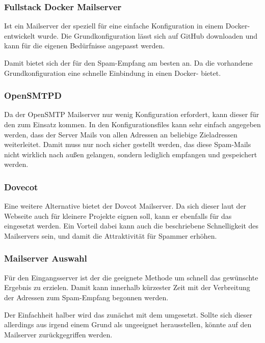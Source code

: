 \documentclass[a4paper,11pt,singlespacing]{article}
\begin{document}
		\subsubsection{Fullstack Docker Mailserver}\label{sec:AuswahlLösungFullstackDockerMailserver}
			Ist ein Mailserver der speziell für eine einfache Konfiguration in einem Docker- entwickelt wurde. Die Grundkonfiguration lässt sich auf GitHub downloaden und kann für die eigenen Bedürfnisse angepasst werden. 
			
			Damit bietet sich der  für den Spam-Empfang am besten an. Da die vorhandene Grundkonfiguration eine schnelle Einbindung in einen Docker- bietet.
		
		\subsubsection{OpenSMTPD}\label{sec:AuswahlLösungOpenSMTPD}
			Da der OpenSMTP Mailserver nur wenig Konfiguration erfordert, kann dieser für den  zum Einsatz kommen. In den Konfigurationsfiles kann sehr einfach angegeben werden, dass der Server Mails von allen Adressen an beliebige Zieladressen weiterleitet.
			Damit muss nur noch sicher gestellt werden, das diese Spam-Mails nicht wirklich nach außen gelangen, sondern lediglich empfangen und gespeichert werden.
		
		\subsubsection{Dovecot}\label{sec:AuswahlLösungDovecot}
			Eine weitere Alternative bietet der Dovcot Mailserver. Da sich dieser laut der Webseite auch für kleinere Projekte eignen soll, kann er ebenfalls für das  eingesetzt werden. Ein Vorteil dabei kann auch die beschriebene Schnelligkeit des Mailservers sein, und damit die  Attraktivität für Spammer erhöhen.

		\subsubsection{Mailserver Auswahl}\label{sec:MailserverAuswahl}	
		Für den Eingangsserver ist der  die geeignete Methode um schnell das gewünschte Ergebnis zu erzielen. Damit kann innerhalb kürzester Zeit mit der Verbreitung der Adressen zum Spam-Empfang begonnen werden.
		
	Der Einfachheit halber wird das  zunächst mit dem  umgesetzt. Sollte sich dieser allerdings aus irgend einem Grund als ungeeignet herausstellen, könnte auf den  Mailserver zurückgegriffen werden.
		
\end{document}
